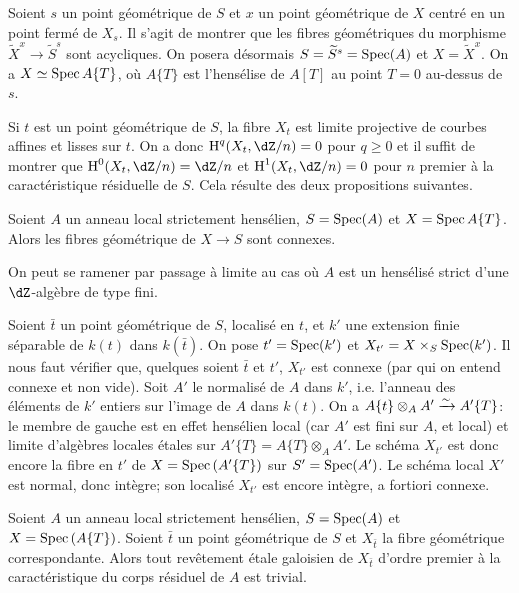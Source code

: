 Soient $s$ un point géométrique de $S$ et $x$ un point géométrique de 
$X$ centré en un point fermé de $X_s$. Il s'agit de montrer que les fibres 
géométriques du morphisme $\widetilde X^x\to \widetilde S^s$ sont 
acycliques. On posera désormais $S=\widetilde S^s=\operatorname{Spec}(A)$ et 
$X=\widetilde X^x$. On a $X\simeq \operatorname{Spec} A\{T\}$, où $A\{T\}$ est l'hensélise 
de $A[T]$ au point $T=0$ au-dessus de $s$. 

Si $t$ est un point géométrique de $S$, la fibre $X_t$ est limite 
projective de courbes affines et lisses sur $t$. On a donc $\h^q(X_t,\dZ/n) = 0$ 
pour $q\geqslant 0$ et il suffit de montrer que $\h^0(X_t,\dZ/n) = \dZ/n$ et 
$\h^1(X_t,\dZ/n) = 0$ pour $n$ premier à la caractéristique résiduelle de 
$S$. Cela résulte des deux propositions suivantes. 





\begin{proposition}\label{I:5-2-2}
Soient $A$ un anneau local strictement hensélien, $S=\operatorname{Spec}(A)$ et 
$X=\operatorname{Spec} A\{T\}$. Alors les fibres géométrique de $X\to S$ sont connexes. 
\end{proposition}

On peut se ramener par passage à limite au cas où $A$ est un hensélisé 
strict d'une $\dZ$-algèbre de type fini. 

Soient $\bar t$ un point géométrique de $S$, localisé en $t$, et $k'$ une 
extension finie séparable de $k(t)$ dans $k(\bar t)$. On pose $t'=\operatorname{Spec}(k')$ 
et $X_{t'} = X\times_S\operatorname{Spec}(k')$. Il nous faut vérifier que, quelques soient 
$\bar t$ et $t'$, $X_{t'}$ est connexe (par qui on entend connexe et non vide). 
Soit $A'$ le normalisé de $A$ dans $k'$, i.e. l'anneau des éléments de 
$k'$ entiers sur l'image de $A$ dans $k(t)$. On a 
$A\{t\}\otimes_A A'\xrightarrow\sim A'\{T\}$: le membre de gauche est en effet hensélien 
local (car $A'$ est fini sur $A$, et local) et limite d'algèbres locales 
étales sur $A'\{T\}=A\{T\}\otimes_A A'$. Le schéma $X_{t'}$ est donc encore 
la fibre en $t'$ de $X=\operatorname{Spec}\left(A'\{T\}\right)$ sur $S'=\operatorname{Spec}(A')$. Le 
schéma local $X'$ est normal, donc intègre; son localisé $X_{t'}$ est 
encore intègre, a fortiori connexe. 





\begin{proposition}\label{I:5-2-3}
Soient $A$ un anneau local strictement hensélien, $S=\operatorname{Spec}(A)$ et 
$X=\operatorname{Spec}\left(A\{T\}\right)$. Soient $\bar t$ un point géométrique de $S$ 
et $X_{\bar t}$ la fibre géométrique correspondante. Alors tout revêtement 
étale galoisien de $X_{\bar t}$ d'ordre premier à la caractéristique du 
corps résiduel de $A$ est trivial. 
\end{proposition}





